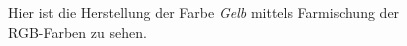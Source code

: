 \documentclass[11pt]{article}
\begin{document}
{\begin{minipage}[t]{0.6\textwidth}
\begin{figure}[H]
\caption{Hier ist die Herstellung der Farbe \textit{Gelb} mittels Farmischung der RGB-Farben zu sehen.}
\label{gelbmix}
\end{figure}
\end{minipage} }
\end{document}
